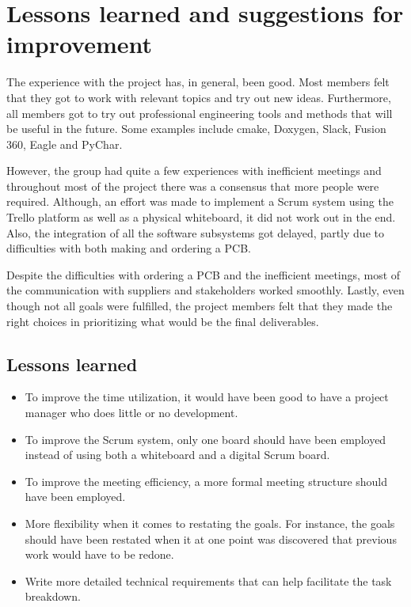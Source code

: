 \documentclass[11pt, titlepage]{article} %
\begin{document}
\section{Lessons learned and suggestions for improvement}
The experience with the project has, in general, been good. Most members felt that they
got to work with relevant topics and try out new ideas. Furthermore, all members got to try out
professional engineering tools and methods that will be useful in the future. Some examples
include cmake, Doxygen, Slack, Fusion 360, Eagle and PyChar.

However, the group had quite a few experiences with inefficient meetings and throughout most
of the project there was a consensus that more people were required. Although, an effort was
made to implement a Scrum system using the Trello platform as well as a physical whiteboard, it
did not work out in the end. Also, the integration of all the software subsystems got
delayed, partly due to difficulties with both making and ordering a PCB.

Despite the difficulties with ordering a PCB and the inefficient meetings, most of the
communication with suppliers and stakeholders worked smoothly. Lastly, even though not
all goals were fulfilled, the project members felt that they made the right choices in
prioritizing what would be the final deliverables.

\subsection{Lessons learned}
\begin{itemize}
    \item To improve the time utilization, it would have been good to have a project
          manager who does little or no development.
    \item To improve the Scrum system, only one board should have been employed instead
          of using both a whiteboard and a digital Scrum board.
    \item To improve the meeting efficiency, a more formal meeting structure should have been
          employed.
    \item More flexibility when it comes to restating the goals. For instance, the goals should
          have been restated when it at one point was discovered that previous work would have to
          be redone.
    \item Write more detailed technical requirements that can help facilitate the task breakdown.
\end{itemize}
\end{document}
